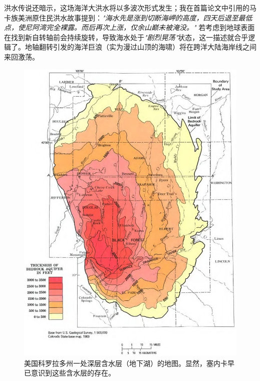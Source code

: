 \documentclass[10pt,twocolumn,letterpaper]{article}
\begin{document}
洪水传说还暗示，这场海洋大洪水将以多波次形式发生；我在首篇论文中引用的马卡族美洲原住民洪水故事\cite{3}提到：\textit{"海水先是涨到切断海岬的高度，四天后退至最低点，使尼阿湾完全裸露。而后再次上涨，仅余山巅未被淹没。"} 若考虑到地球表面在找到新自转轴前会持续旋转，导致海水处于\textit{"剧烈晃荡"}状态，这一描述就合乎逻辑了。地轴翻转引发的海洋巨浪（实为漫过山顶的海啸）将在跨洋大陆海岸线之间来回激荡。
\begin{figure}[t]
\begin{center}
   \includegraphics[width=1\linewidth]{aquifer.jpg}
\end{center}
   \caption{美国科罗拉多州一处深层含水层（地下湖）的地图。显然，塞内卡早已意识到这些含水层的存在。}
\label{fig:2}
\label{fig:onecol}
\end{figure}
\end{document}
